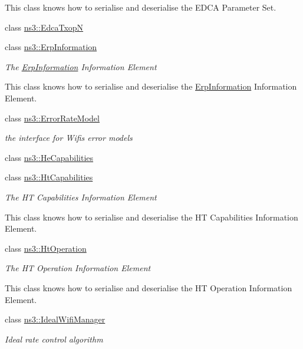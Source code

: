 \begin{DoxyCompactItemize}
\begin{DoxyCompactList}
This class knows how to serialise and deserialise the E\+D\+CA Parameter Set. \end{DoxyCompactList}\item 
class \hyperlink{classns3_1_1EdcaTxopN}{ns3\+::\+Edca\+TxopN}
\item 
class \hyperlink{classns3_1_1ErpInformation}{ns3\+::\+Erp\+Information}
\begin{DoxyCompactList}\small\item\em The \hyperlink{classns3_1_1ErpInformation}{Erp\+Information} Information Element

This class knows how to serialise and deserialise the \hyperlink{classns3_1_1ErpInformation}{Erp\+Information} Information Element. \end{DoxyCompactList}\item 
class \hyperlink{classns3_1_1ErrorRateModel}{ns3\+::\+Error\+Rate\+Model}
\begin{DoxyCompactList}\small\item\em the interface for Wifi\textquotesingle{}s error models \end{DoxyCompactList}\item 
class \hyperlink{classns3_1_1HeCapabilities}{ns3\+::\+He\+Capabilities}
\item 
class \hyperlink{classns3_1_1HtCapabilities}{ns3\+::\+Ht\+Capabilities}
\begin{DoxyCompactList}\small\item\em The HT Capabilities Information Element

This class knows how to serialise and deserialise the HT Capabilities Information Element. \end{DoxyCompactList}\item 
class \hyperlink{classns3_1_1HtOperation}{ns3\+::\+Ht\+Operation}
\begin{DoxyCompactList}\small\item\em The HT Operation Information Element

This class knows how to serialise and deserialise the HT Operation Information Element. \end{DoxyCompactList}\item 
class \hyperlink{classns3_1_1IdealWifiManager}{ns3\+::\+Ideal\+Wifi\+Manager}
\begin{DoxyCompactList}\small\item\em Ideal rate control algorithm


\end{DoxyCompactList}
\end{DoxyCompactItemize}
